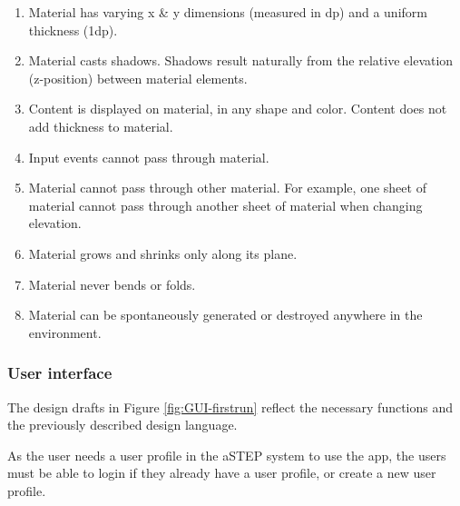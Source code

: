 \begin{enumerate}
	\item Material has varying x \& y dimensions (measured in dp) and a uniform thickness (1dp).
	\item Material casts shadows. Shadows result naturally from the relative elevation (z-position) between material elements.
	\item Content is displayed on material, in any shape and color. Content does not add thickness to material.
	\item Input events cannot pass through material.
	\item Material cannot pass through other material. For example, one sheet of material cannot pass through another sheet of material when changing elevation.
	\item Material grows and shrinks only along its plane.
	\item Material never bends or folds.
	\item Material can be spontaneously generated or destroyed anywhere in the environment.
\end{enumerate} 


\subsubsection{User interface}
The design drafts in Figure \ref{fig:GUI-firstrun} reflect the necessary functions and the previously described design language. 

As the user needs a user profile in the aSTEP system to use the app, the users must be able to login if they already have a user profile, or create a new user profile.

